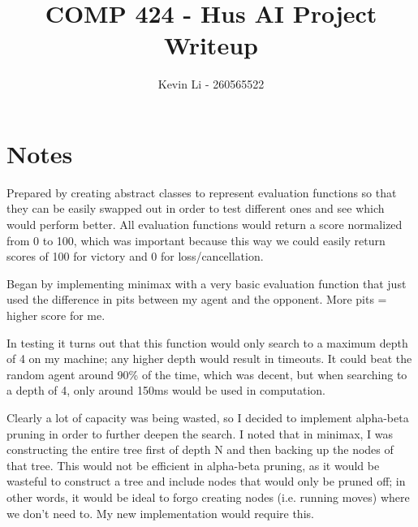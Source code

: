 \documentclass{article}
\title{COMP 424 - Hus AI Project Writeup}
\author{Kevin Li - 260565522}
\begin{document}
\maketitle
\newpage

\section{Notes}

Prepared by creating abstract classes to represent evaluation functions so that they can be easily swapped out
    in order to test different ones and see which would perform better. All evaluation functions would return a score normalized
    from 0 to 100, which was important because this way we could easily return scores of 100 for victory and 0 for loss/cancellation.

Began by implementing minimax with a very basic evaluation function that just used the difference in pits between my agent and
    the opponent. More pits = higher score for me.

In testing it turns out that this function would only search to a maximum depth of 4 on my machine;
    any higher depth would result in timeouts. It could beat the random agent around 90\% of the time, which was decent, but
    when searching to a depth of 4, only around 150ms would be used in computation.

Clearly a lot of capacity was being wasted, so I decided to implement alpha-beta pruning in order to further deepen the search.
    I noted that in minimax, I was constructing the entire tree first of depth N and then backing up the nodes of that tree. This would not
    be efficient in alpha-beta pruning, as it would be wasteful to construct a tree and include nodes that would only be pruned off;
    in other words, it would be ideal to forgo creating nodes (i.e. running moves) where we don't need to. My new implementation would
    require this.
\end{document}
